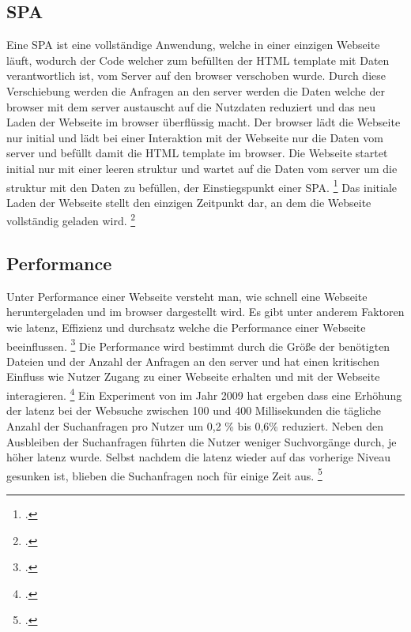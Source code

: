 \subsection{\ac{SPA}}
Eine \ac{SPA} ist eine vollständige Anwendung, welche in einer einzigen Webseite läuft, wodurch der Code welcher zum befüllten der \ac{HTML} \gls{template}
mit Daten verantwortlich ist, vom Server auf den \gls{browser} verschoben wurde.
Durch diese Verschiebung werden die Anfragen an den \gls{server} werden die Daten welche der \gls{browser} mit dem \gls{server} austauscht auf die Nutzdaten reduziert
und das neu Laden der Webseite im \gls{browser} überflüssig macht.
Der \gls{browser} lädt die Webseite nur initial und lädt bei einer Interaktion mit der Webseite nur die Daten vom \gls{server} und befüllt damit die \ac{HTML} \gls{template} im \gls{browser}.
Die Webseite startet initial nur mit einer leeren \gls{struktur} und wartet auf die Daten vom \gls{server} um die \gls{struktur} mit den Daten zu befüllen, der Einstiegspunkt einer \ac{SPA}. \footcite[Vgl.][Seite 23]{Doguhan2020}
Das initiale Laden der Webseite stellt den einzigen Zeitpunkt dar, an dem die Webseite vollständig geladen wird. \footcite[Vgl.][Seite 4 - 8]{Scott2015}

\subsection{Performance}
Unter Performance einer Webseite versteht man, wie schnell eine Webseite heruntergeladen und im \gls{browser} dargestellt wird.
Es gibt unter anderem Faktoren wie \gls{latenz}, Effizienz und \gls{durchsatz} welche die Performance einer Webseite beeinflussen. \footcite[Vgl.][Seite 53]{Killelea2002}
Die Performance wird bestimmt durch die Größe der benötigten Dateien und der Anzahl der Anfragen an den \gls{server}
und hat einen kritischen Einfluss wie Nutzer Zugang zu einer Webseite erhalten und mit der Webseite interagieren. \footcite[Vgl.][Seite 44]{Robbins2018}
Ein Experiment von  im Jahr 2009 hat ergeben dass eine Erhöhung der \gls{latenz} bei der Websuche zwischen 100 und 400 Millisekunden die tägliche
Anzahl der Suchanfragen pro Nutzer um 0,2 \% bis 0,6\% reduziert.
Neben den Ausbleiben der Suchanfragen führten die Nutzer weniger Suchvorgänge durch, je höher \gls{latenz} wurde.
Selbst nachdem die \gls{latenz} wieder auf das vorherige Niveau gesunken ist, blieben die Suchanfragen noch für einige Zeit aus. \footcite[Vgl.][Seite 1]{Google2009}

